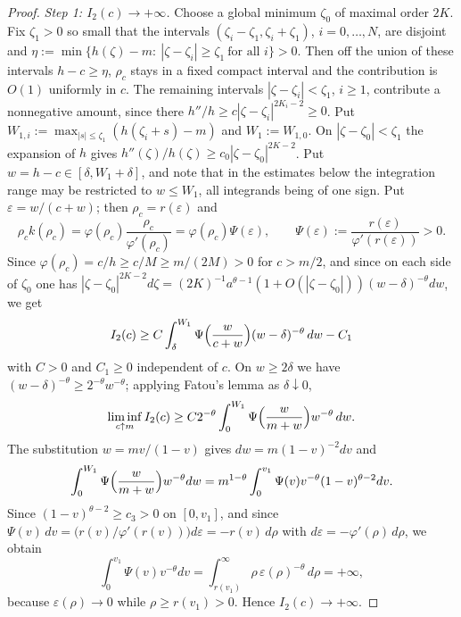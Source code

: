 \documentclass[11pt]{article}
\theoremstyle{definition}
\begin{document}
\begin{proof}
\emph{Step 1: $I_2(c)\to+\infty$.}  Choose a global minimum $\zeta_0$ of
maximal order $2K$.  Fix $\zeta_1>0$ so small that the intervals
$(\zeta_i-\zeta_1,\zeta_i+\zeta_1)$, $i=0,\dots,N$, are disjoint and
$\eta:=\min\{h(\zeta)-m:\ |\zeta-\zeta_i|\ge\zeta_1\ \text{for all }i\}>0$.
Then off the union of these intervals $h-c\ge\eta$, $\rho_c$ stays in a fixed
compact interval and the contribution is $O(1)$ uniformly in $c$.  The
remaining intervals $|\zeta-\zeta_i|<\zeta_1$, $i\ge1$, contribute a
nonnegative amount, since there $h''/h\ge c|\zeta-\zeta_i|^{2K_i-2}\ge0$.
Put
$W_{1,i}:=\max_{|s|\le\zeta_1}(h(\zeta_i+s)-m)$ and $W_1:=W_{1,0}$.  On
$|\zeta-\zeta_0|<\zeta_1$ the expansion of $h$ gives
$h''(\zeta)/h(\zeta)\ge c_0|\zeta-\zeta_0|^{2K-2}$.  Put
$w=h-c\in[\delta,W_1+\delta]$, and note that in the estimates below the
integration range may be restricted to $w\le W_1$, all integrands being of one
sign.  Put $\varepsilon=w/(c+w)$; then
$\rho_c=r(\varepsilon)$ and
\begin{equation}
\rho_c k(\rho_c)=\varphi(\rho_c)\frac{\rho_c}{\varphi'(\rho_c)}
=\varphi(\rho_c)\Psi(\varepsilon),\qquad
\Psi(\varepsilon):=\frac{r(\varepsilon)}{\varphi'(r(\varepsilon))}>0 .
\end{equation}
Since $\varphi(\rho_c)=c/h\ge c/M\ge m/(2M)>0$ for $c>m/2$, and since on each
side of $\zeta_0$ one has
$|\zeta-\zeta_0|^{2K-2}d\zeta
=(2K)^{-1}a^{\theta-1}(1+O(|\zeta-\zeta_0|))(w-\delta)^{-\theta}dw$, we get
\begin{equation}
I_2(c)\ge C\int_{\delta}^{W_1}\Psi\Bigl(\frac{w}{c+w}\Bigr)
(w-\delta)^{-\theta}\,dw-C_1
\end{equation}
with $C>0$ and $C_1\ge0$ independent of $c$.  On $w\ge2\delta$ we have
$(w-\delta)^{-\theta}\ge2^{-\theta}w^{-\theta}$; applying Fatou's lemma as
$\delta\downarrow0$,
\begin{equation}
\liminf_{c\uparrow m}I_2(c)\ge
C2^{-\theta}\int_0^{W_1}\Psi\Bigl(\frac{w}{m+w}\Bigr)w^{-\theta}\,dw .
\end{equation}
The substitution $w=mv/(1-v)$ gives $dw=m(1-v)^{-2}dv$ and
\begin{equation}
\int_0^{W_1}\Psi\Bigl(\frac{w}{m+w}\Bigr)w^{-\theta}dw
=m^{1-\theta}\int_0^{v_1}\Psi(v)v^{-\theta}(1-v)^{\theta-2}dv .
\end{equation}
Since $(1-v)^{\theta-2}\ge c_3>0$ on $[0,v_1]$, and since
$\Psi(v)\,dv=\bigl(r(v)/\varphi'(r(v))\bigr)d\varepsilon=-r(v)\,d\rho$
with $d\varepsilon=-\varphi'(\rho)\,d\rho$, we obtain
\begin{equation}
\int_0^{v_1}\Psi(v)v^{-\theta}dv
=\int_{r(v_1)}^{\infty}\rho\,\varepsilon(\rho)^{-\theta}\,d\rho=+\infty,
\end{equation}
because $\varepsilon(\rho)\to0$ while $\rho\ge r(v_1)>0$.  Hence
$I_2(c)\to+\infty$.


\end{proof}
\end{document}
